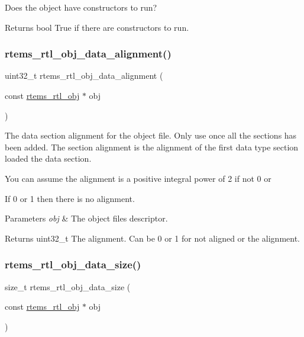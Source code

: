 Does the object have constructors to run?

\begin{DoxyReturn}{Returns}
bool True if there are constructors to run. 
\end{DoxyReturn}
\mbox{\label{rtl-obj_8h_a9a3dae296e05206c99846c099789becc}} 
\subsubsection{\texorpdfstring{rtems\_rtl\_obj\_data\_alignment()}{rtems\_rtl\_obj\_data\_alignment()}}
{\footnotesize\ttfamily uint32\+\_\+t rtems\+\_\+rtl\+\_\+obj\+\_\+data\+\_\+alignment (\begin{DoxyParamCaption}\item[{const \mbox{\hyperlink{structrtems__rtl__obj}{rtems\+\_\+rtl\+\_\+obj}} $\ast$}]{obj }\end{DoxyParamCaption})}

The data section alignment for the object file. Only use once all the sections has been added. The section alignment is the alignment of the first data type section loaded the data section.

You can assume the alignment is a positive integral power of 2 if not 0 or
\begin{DoxyEnumerate}
\item If 0 or 1 then there is no alignment.
\end{DoxyEnumerate}


\begin{DoxyParams}{Parameters}
{\em obj} & The object file\textquotesingle{}s descriptor. \\
\hline
\end{DoxyParams}
\begin{DoxyReturn}{Returns}
uint32\+\_\+t The alignment. Can be 0 or 1 for not aligned or the alignment. 
\end{DoxyReturn}
\mbox{\label{rtl-obj_8h_a603ec80c7cf7d1a2f01f400b3e5c93d8}} 
\subsubsection{\texorpdfstring{rtems\_rtl\_obj\_data\_size()}{rtems\_rtl\_obj\_data\_size()}}
{\footnotesize\ttfamily size\+\_\+t rtems\+\_\+rtl\+\_\+obj\+\_\+data\+\_\+size (\begin{DoxyParamCaption}\item[{const \mbox{\hyperlink{structrtems__rtl__obj}{rtems\+\_\+rtl\+\_\+obj}} $\ast$}]{obj }\end{DoxyParamCaption})}

